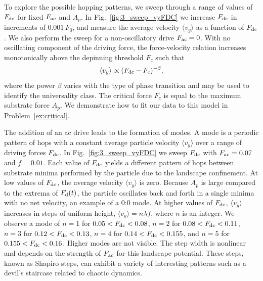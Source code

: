 \documentclass[preprint,showpacs,preprintnumbers,amsmath,amssymb,aps,prb]{revtex4-1}
\theoremstyle{remark}
\begin{document}
To explore the possible hopping patterns,
we sweep through a range of values of $F_{\rm dc}$ for fixed $F_{\rm ac}$ and $A_p$.
In Fig.~\ref{fig:3_sweep_vyFDC} 
we increase $F_{\rm dc}$ in increments of $0.001\,F_0$,
and 
measure the average velocity $\langle v_y \rangle $ 
as a function of $F_{\rm dc}$.
We also perform the sweep for a non-oscillatory drive $F_{\rm ac} = 0$.
With no oscillating component of the driving force,
  the force-velocity relation increases monotonically 
  above the depinning threshold $F_c$ such that
  \begin{equation}
    \langle v_y \rangle \propto (F_{\rm dc}-F_c)^{-\beta},
  \end{equation}
  where the power $\beta$ varies with the
  type of phase transition and 
  may 
  be used to identify the universality class.\cite{Reichhardt2017} 
  The critical force $F_c$ is equal to the maximum substrate force
  $A_p$.
  We demonstrate how to fit our data to this model in Problem~\ref{ex:critical}.
 
The addition of an ac drive leads
  to the formation of modes.
  A mode is a periodic pattern of hops
  with a constant average particle velocity $\langle {v}_{y} \rangle$
  over a range of driving forces $F_{\rm dc}$.
  In Fig.~\ref{fig:3_sweep_vyFDC}
  we sweep $F_{\rm dc}$
  with $F_{\rm ac} = 0.07$ and $f=0.01$.
Each value of $F_{\rm dc}$ yields a different pattern of hops
between substrate minima
performed by the particle
due to the landscape confinement.  %
At 
low values of $F_{\rm dc}$, the average velocity $\langle v_y \rangle$ is zero.
Because 
$A_p$ is large compared to the extrema of $F_{\rm d}(t)$,
the particle oscillates back and forth
in a single minima with no net velocity, an example of 
a 0:0 mode.
At higher values of $F_{\rm dc}$,    
$\langle v_{y} \rangle$ increases in steps of uniform height,
$\langle v_{y} \rangle = n \lambda f$,
where $n$ is an integer.
We observe a mode of $n=1$
for   $0.05 < F_{\rm dc} < 0.08$,
$n=2$ for $0.08 < F_{\rm dc} < 0.11$,
$n=3$ for $0.12 < F_{\rm dc} < 0.13$,
$n=4$ for $0.14 < F_{\rm dc} < 0.155$, and 
$n=5$ for $0.155 < F_{\rm dc} < 0.16$.
Higher modes are not visible.
The step width is nonlinear
and depends on the strength of $F_{\rm ac}$
for this landscape potential.\cite{Reichhardt2000,Juniper2017}
These steps, known as Shapiro steps, can exhibit a variety of
interesting patterns
such as a devil's staircase related to chaotic dynamics.\cite{Bak1986}
\end{document}
